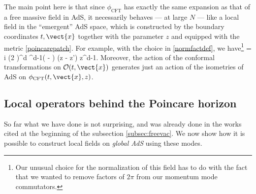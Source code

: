 The main point here is that since $\phi_{\text{CFT}}$ has exactly the same expansion as that of a free massive field in AdS, it necessarily behaves --- at large $N$ --- like a local field in the ``emergent'' AdS space, which is constructed by the boundary coordinates $t,\vect{x}$ together with the parameter $z$ and equipped with the metric \eqref{poincarepatch}. For example, with the choice in \eqref{normfactdef}, we have\footnote{Our unusual choice for the normalization of this field has to do with the fact that we wanted to remove factors of $2 \pi$ from our momentum mode commutators.}
 = {i \over (2 \pi)^d} \delta^{d-1}( - ) \delta(z - z') z^{d-1}.
\ee
Moreover, the action of the conformal transformations on ${\cal O}(t,\vect{x})$ generates just an action of the isometries of AdS on $\phi_{\text{CFT}}(t,\vect{x},z)$. 


\subsection{Local operators behind the Poincare horizon}
So far what we have done is not surprising, and was already done in the works cited at the beginning of the subsection \ref{subsec:freevac}. We now show how it is possible to construct local fields on {\em global AdS} using these modes. 

